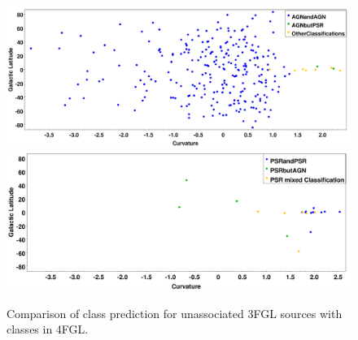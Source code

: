 \begin{figure}[h]
\includegraphics[width=\twopicsp\textwidth]{plots/AGN.pdf}
\includegraphics[width=\twopicsp\textwidth]{plots/PSR3.pdf}
\caption{Comparison of class prediction for unassociated 3FGL sources with classes in 4FGL. }
\label{fig:Maps_data}
\end{figure}
